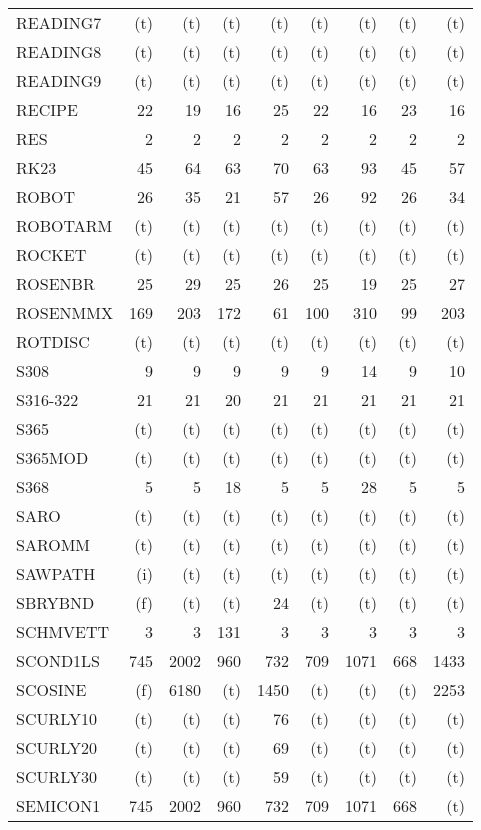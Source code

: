 \documentclass[11pt,twoside]{article}
\begin{document}
{\begin{longtable}[c]{|l|r|r|r|r|r|r|r|r|}
 READING7 & (t) & (t) & (t) & (t) & (t) & (t) & (t) & (t) \\
 READING8 & (t) & (t) & (t) & (t) & (t) & (t) & (t) & (t) \\
 READING9 & (t) & (t) & (t) & (t) & (t) & (t) & (t) & (t) \\
 RECIPE & 22 & 19 & 16 & 25 & 22 & 16 & 23 & 16 \\
 RES & 2 & 2 & 2 & 2 & 2 & 2 & 2 & 2 \\
 RK23 & 45 & 64 & 63 & 70 & 63 & 93 & 45 & 57 \\
 ROBOT & 26 & 35 & 21 & 57 & 26 & 92 & 26 & 34 \\
 ROBOTARM & (t) & (t) & (t) & (t) & (t) & (t) & (t) & (t) \\
 ROCKET & (t) & (t) & (t) & (t) & (t) & (t) & (t) & (t) \\
 ROSENBR & 25 & 29 & 25 & 26 & 25 & 19 & 25 & 27 \\
 ROSENMMX & 169 & 203 & 172 & 61 & 100 & 310 & 99 & 203 \\
 ROTDISC & (t) & (t) & (t) & (t) & (t) & (t) & (t) & (t) \\
 S308 & 9 & 9 & 9 & 9 & 9 & 14 & 9 & 10 \\
 S316-322 & 21 & 21 & 20 & 21 & 21 & 21 & 21 & 21 \\
 S365 & (t) & (t) & (t) & (t) & (t) & (t) & (t) & (t) \\
 S365MOD & (t) & (t) & (t) & (t) & (t) & (t) & (t) & (t) \\
 S368 & 5 & 5 & 18 & 5 & 5 & 28 & 5 & 5 \\
 SARO & (t) & (t) & (t) & (t) & (t) & (t) & (t) & (t) \\
 SAROMM & (t) & (t) & (t) & (t) & (t) & (t) & (t) & (t) \\
 SAWPATH & (i) & (t) & (t) & (t) & (t) & (t) & (t) & (t) \\
 SBRYBND & (f) & (t) & (t) & 24 & (t) & (t) & (t) & (t) \\
 SCHMVETT & 3 & 3 & 131 & 3 & 3 & 3 & 3 & 3 \\
 SCOND1LS & 745 & 2002 & 960 & 732 & 709 & 1071 & 668 & 1433 \\
 SCOSINE & (f) & 6180 & (t) & 1450 & (t) & (t) & (t) & 2253 \\
 SCURLY10 & (t) & (t) & (t) & 76 & (t) & (t) & (t) & (t) \\
 SCURLY20 & (t) & (t) & (t) & 69 & (t) & (t) & (t) & (t) \\
 SCURLY30 & (t) & (t) & (t) & 59 & (t) & (t) & (t) & (t) \\
 SEMICON1 & 745 & 2002 & 960 & 732 & 709 & 1071 & 668 & (t) \\

\end{longtable}}
\end{document}
